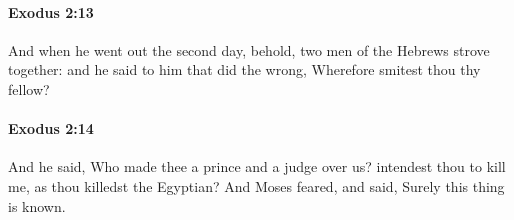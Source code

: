 		\paragraph{Exodus 2:13} %
			\label{EXODUS-2-13}

			And when he went out the second day, behold, two men of the Hebrews strove together: and he said to him that did the wrong, Wherefore smitest thou thy fellow?


		\paragraph{Exodus 2:14} %
			\label{EXODUS-2-14}

			And he said, Who made thee a prince and a judge over us? intendest thou to kill me, as thou killedst the Egyptian? And Moses feared, and said, Surely this thing is known.


